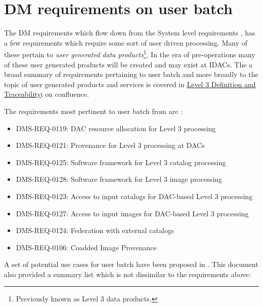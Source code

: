 \section{DM requirements on user batch} \label{sec:requirements}

The DM requirements  which flow down from the System level requirements ,
has  a few requirements which require some sort of user driven processing.
Many of these pertain to {\em user generated data products}\footnote{Previously known as Level 3 data products.}.
In the era of pre-operations many of these user generated products will be created and may exist at IDACs.
The a broad summary of requirements pertaining to user batch and more broadly to the topic of user generated products and services is covered in  \href{https://confluence.lsstcorp.org/display/DM/Level+3+Definition+and+Traceability}{Level 3 Definition and Traceability}i on confluence.

The requirements most pertinent to user batch from  are :

\begin{itemize}
\item DMS-REQ-0119: DAC resource allocation for Level 3 processing
\item DMS-REQ-0121: Provenance for Level 3 processing at DACs
\item DMS-REQ-0125: Software framework for Level 3 catalog processing
\item DMS-REQ-0128: Software framework for Level 3 image processing
\item DMS-REQ-0123: Access to input catalogs for DAC-based Level 3 processing
\item DMS-REQ-0127: Access to input images for DAC-based Level 3 processing
\item DMS-REQ-0124: Federation with external catalogs
\item DMS-REQ-0106: Coadded Image Provenance
\end{itemize}


A set of potential use cases for user batch have been proposed in .
This document also provided a summary list which is not dissimilar to the requirements above:

